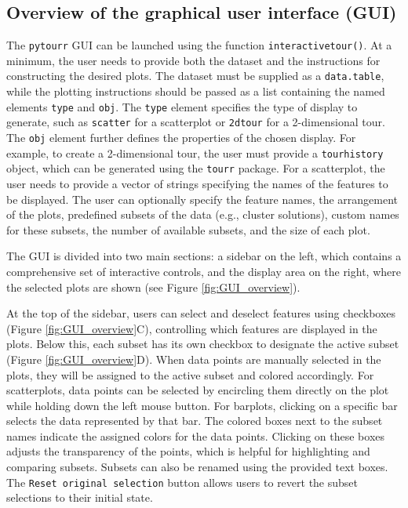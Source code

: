 \documentclass[article]{ajs}
\begin{document}
\subsection{Overview of the graphical user interface (GUI)}

The \texttt{pytourr} GUI can be launched using the function \texttt{interactive\textunderscore tour()}. At a minimum, the user needs to provide both the dataset and the instructions for constructing the desired plots. The dataset must be supplied as a \texttt{data.table}, while the plotting instructions should be passed as a list containing the named elements \texttt{type} and \texttt{obj}. The \texttt{type} element specifies the type of display to generate, such as \texttt{scatter} for a scatterplot or \texttt{2d\textunderscore tour} for a 2-dimensional tour. The \texttt{obj} element further defines the properties of the chosen display. For example, to create a 2-dimensional tour, the user must provide a \texttt{tour\textunderscore history} object, which can be generated using the \texttt{tourr} package. For a scatterplot, the user needs to provide a vector of strings specifying the names of the features to be displayed. The user can optionally specify the feature names, the arrangement of the plots, predefined subsets of the data (e.g., cluster solutions), custom names for these subsets, the number of available subsets, and the size of each plot.

The GUI is divided into two main sections: a sidebar on the left, which contains a comprehensive set of interactive controls, and the display area on the right, where the selected plots are shown (see Figure \ref{fig:GUI_overview}).

At the top of the sidebar, users can select and deselect features using checkboxes (Figure \ref{fig:GUI_overview}C), controlling which features are displayed in the plots. Below this, each subset has its own checkbox to designate the active subset (Figure \ref{fig:GUI_overview}D). When data points are manually selected in the plots, they will be assigned to the active subset and colored accordingly. For scatterplots, data points can be selected by encircling them directly on the plot while holding down the left mouse button. For barplots, clicking on a specific bar selects the data represented by that bar. The colored boxes next to the subset names indicate the assigned colors for the data points. Clicking on these boxes adjusts the transparency of the points, which is helpful for highlighting and comparing subsets. Subsets can also be renamed using the provided text boxes. The \texttt{Reset original selection} button allows users to revert the subset selections to their initial state.
\end{document}

